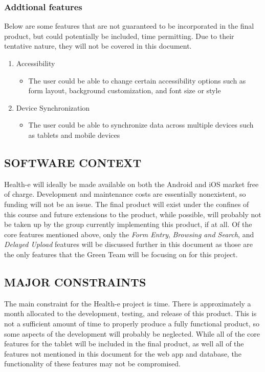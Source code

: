 \documentclass[twoside,letterpaper]{article}
\begin{document}
\subsubsection{Addtional features}
{\rmfamily\color{black}
Below are some features that are not guaranteed to be incorporated in the final product, but could potentially be included, time permitting. Due to their tentative nature, they will not be covered in this document.
\begin{enumerate}
\item Accessibility
\begin{itemize}
\item The user could be able to change certain accessibility options such as form layout, background customization, and font size or style
\end{itemize}
\item Device Synchronization
\begin{itemize}
\item The user could be able to synchronize data across multiple devices such as tablets and mobile devices
\end{itemize}
\end{enumerate}
}

\subsection[SOFTWARE CONTEXT]{\rmfamily\bfseries\color{black}
SOFTWARE CONTEXT}
{\rmfamily\color{black}
Health-e will ideally be made available on both the Android and iOS market free of charge. Development and maintenance costs are essentially nonexistent, so funding will not be an issue. The final product will exist under the confines of this course and future extensions to the product, while possible, will probably not be taken up by the group currently implementing this product, if at all.
\newline\newline Of the core features mentioned above, only the \textit{Form Entry}, \textit{Browsing and Search}, and \textit{Delayed Upload} features will be discussed further in this document as those are the only features that the Green Team will be focusing on for this project.
}

\subsection[MAJOR CONSTRAINTS]{\rmfamily\bfseries\color{black}
MAJOR CONSTRAINTS}
{\rmfamily\color{black}
The main constraint for the Health-e project is time. There is approximately a month allocated to the development, testing, and release of this product. This is not a sufficient amount of time to properly produce a fully functional product, so some aspects of the development will probably be neglected. While all of the core features for the tablet will be included in the final product, as well all of the features not mentioned in this document for the web app and database, the functionality of these features may not be compromised.
}
\end{document}

